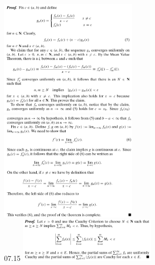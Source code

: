 \documentclass[3pt,landscape]{article}
\begin{document}
\begin{multicols}{3}
    \includegraphics[width=250]{07_12a.png} \\
    \includegraphics[width=250]{07_12b.png} \\
    07.15
    \includegraphics[width=250]{07_15.png} \\

\end{multicols}
\end{document}
